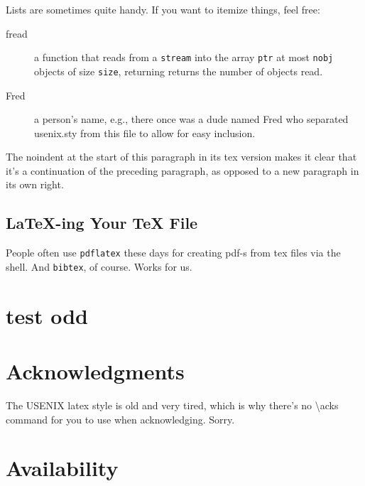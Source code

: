 Lists are sometimes quite handy. If you want to itemize things, feel free:\par

\begin{description}

    \item[fread] a function that reads from a \texttt{stream} into the array \texttt{ptr} at most \texttt{nobj} objects of size \texttt{size}, returning returns the number of objects read.

    \item[Fred] a person's name, e.g., there once was a dude named Fred who separated usenix.sty from this file to allow for easy inclusion.
\end{description}

\noindent
The noindent at the start of this paragraph in its tex version makes it clear that it's a continuation of the preceding paragraph, as opposed to a new paragraph in its own right.\par


\subsection{LaTeX-ing Your TeX File}

People often use \texttt{pdflatex} these days for creating pdf-s from tex files via the shell. And \texttt{bibtex}, of course. Works for us.\par

\section{test odd}
\zhlipsum[9-13]

\section*{Acknowledgments}

The USENIX latex style is old and very tired, which is why there's no \textbackslash{}acks command for you to use when acknowledging. Sorry.\par

\section*{Availability}

